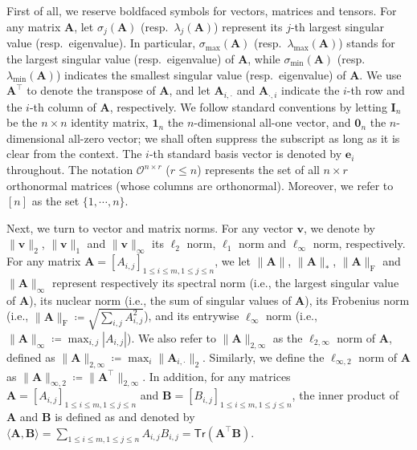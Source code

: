 First of all, we reserve boldfaced symbols  for vectors, matrices and tensors.
For any matrix $\bm{A}$, let $\sigma_{j}(\bm{A})$ (resp.~$\lambda_{j}(\bm{A})$) represent its $j$-th largest singular value (resp.~eigenvalue).
In particular, $\sigma_{\max}(\bm{A})$ (resp.~$\lambda_{\max}(\bm{A})$) stands for the largest singular value (resp.~eigenvalue) of $\bm{A}$,
while $\sigma_{\min}(\bm{A})$ (resp.~$\lambda_{\min}(\bm{A})$) indicates the smallest singular value (resp.~eigenvalue) of $\bm{A}$.
We use $\bm{A}^{\top}$ to denote the transpose of $\bm{A}$, and
let $\bm{A}_{i,\cdot}$ and $\bm{A}_{\cdot,i}$ indicate the $i$-th row and the $i$-th column of $\bm{A}$, respectively.
We follow standard conventions by letting
$\bm{I}_{n}$ be the $n\times n$ identity matrix, $\bm{1}_{n}$ the $n$-dimensional all-one vector, and $\bm{0}_{n}$ the $n$-dimensional all-zero vector;
we shall often suppress the subscript as long as it is clear from the context.
The $i$-th standard basis vector is denoted by $\bm{e}_i$ throughout.
The notation $\mathcal{O}^{n\times r}$ ($r\leq n$) represents the set of all $n\times r$ orthonormal matrices (whose columns are orthonormal). Moreover, we refer to $[n]$ as the set $\{1,\cdots, n\}$.


Next, we  turn to vector and matrix norms. For any vector $\bm{v}$, we denote by $\|\bm{v}\|_2$, $\|\bm{v}\|_1$ and $\|\bm{v}\|_{\infty}$  its $\ell_2$ norm, $\ell_1$ norm and $\ell_{\infty}$ norm, respectively.
 For any matrix $\bm{A}=[A_{i,j}]_{1\leq i\leq m,1\leq j\leq n}$,  we let $\|\bm{A}\|$, $\|\bm{A}\|_{*}$, $\|\bm{A}\|_{\mathrm{F}}$ and $\|\bm{A}\|_{\infty}$  represent respectively its spectral norm (i.e., the largest singular value of $\bm{A}$), its nuclear norm (i.e., the sum of singular values of $\bm{A}$), its Frobenius norm (i.e., $\|\bm{A}\|_{\mathrm{F}} \coloneqq \sqrt{\sum_{i,j}A_{i,j}^2}$), and its entrywise $\ell_{\infty}$ norm (i.e., $\|\bm{A}\|_{\infty} \coloneqq \max_{i,j}|A_{i,j}|$).
We also refer to $\|\bm{A}\|_{2,\infty}$  as the $\ell_{2,\infty}$ norm  of $\bm{A}$,
defined as $\|\bm{A}\|_{2,\infty} \coloneqq \max_i \|\bm{A}_{i,\cdot}\|_2$.
Similarly, we define the $\ell_{\infty,2}$ norm  of $\bm{A}$ as $\|\bm{A}\|_{\infty,2} \coloneqq \|\bm{A}^{\top}\|_{2,\infty}$.
In addition, for any matrices $\bm{A}=[A_{i,j}]_{1\leq i\leq m,1\leq j\leq n}$ and $\bm{B}=[B_{i,j}]_{1\leq i\leq m,1\leq j\leq n}$,
the inner product of $\bm{A}$ and $\bm{B}$ is defined as and denoted by $\langle \bm{A}, \bm{B} \rangle = \sum_{1\leq i\leq m,1\leq j\leq n} A_{i,j} B_{i,j} = \mathsf{Tr}(\bm{A}^{\top}\bm{B})$. 


